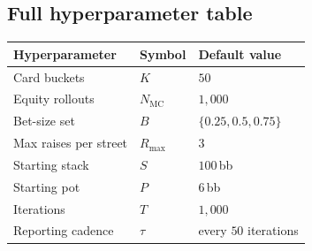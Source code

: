 \subsection*{Full hyperparameter table}
\begin{center}
\begin{tabular}{lll}
  \toprule
  Hyperparameter            & Symbol            & Default value \\
  \midrule
  Card buckets              & $K$               & $50$ \\
  Equity rollouts           & $N_{\mathrm{MC}}$ & $1{,}000$ \\
  Bet-size set              & $B$               & $\{0.25, 0.5, 0.75\}$ \\
  Max raises per street     & $R_{\max}$        & $3$ \\
  Starting stack            & $S$               & $100$\,bb \\
  Starting pot              & $P$               & $6$\,bb \\
  Iterations                & $T$               & $1{,}000$ \\
  Reporting cadence         & $\tau$            & every $50$ iterations \\
  \bottomrule
\end{tabular}
\end{center}
